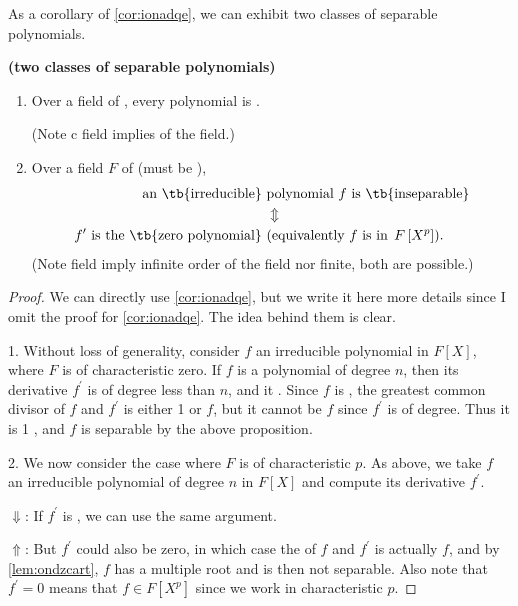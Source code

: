 \documentclass{article}
\newcommand{\bfs}[1]{\textbf{({#1}) }}
\begin{document}
As a corollary of \cref{cor:ionadqe}, we can exhibit two classes of separable polynomials.
\begin{cora}\bfs{two classes of separable polynomials}\label{cor:ibndad}
\begin{enumerate}
    \item Over a field of , every polynomial is . 
    
    (Note c field implies  of the field.)
    \item Over a field $F$ of  (must be ), 
    \begin{align*}
        \text{an \tb{irreducible} } & \text{polynomial $f$ is \tb{inseparable}}\\
        & \Updownarrow\\
        \text{$f^{\prime}$ is the \tb{zero polynomial} } &\text{(equivalently $f$ is in $\left.F\left[X^{p}\right]\right)$.}
    \end{align*}
    (Note  field  imply infinite order of the field nor finite, both are possible.)
\end{enumerate}
\end{cora}
\begin{proof}
We can directly use \cref{cor:ionadqe}, but we write it here more details since I omit the proof for \cref{cor:ionadqe}. The idea behind them is clear.

1. Without loss of generality, consider $f$ an irreducible polynomial in $F[X]$, where $F$ is of characteristic zero. If $f$ is a polynomial of degree $n$, then its derivative $f^{\prime}$ is of degree less than $n$, and it . Since $f$ is , the greatest common divisor of $f$ and $f^{\prime}$ is either 1 or $f$, but it cannot be $f$ since $f^{\prime}$ is of  degree. Thus it is 1 , and $f$ is separable by the above proposition.

2. We now consider the case where $F$ is of characteristic $p$. As above, we take $f$ an irreducible polynomial of degree $n$ in $F[X]$ and compute its derivative $f^{\prime}$.

$\Downarrow$: If $f^{\prime}$ is , we can use the same argument. 

$\Uparrow$: But $f^{\prime}$ could also be zero, in which case the  of $f$ and $f^{\prime}$ is actually $f$, and by \cref{lem:ondzcart}, $f$ has a multiple root and is then not separable. Also note that $f^{\prime}=0$ means that $f \in F\left[X^{p}\right]$ since we work in characteristic $p$.
\end{proof} 
\end{document}
